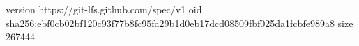 version https://git-lfs.github.com/spec/v1
oid sha256:ebf0cb02bf120c93f77b8fc95fa29b1d0eb17dcd08509fbf025da1fcbfe989a8
size 267444
